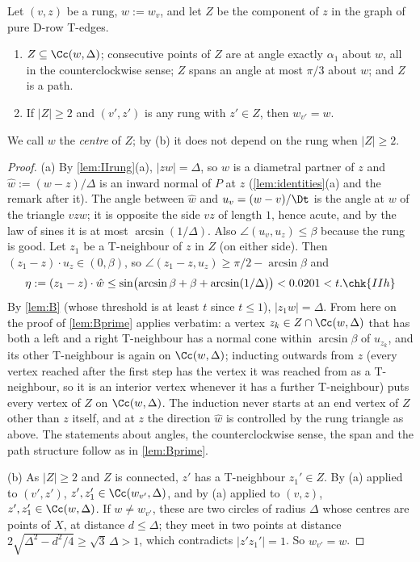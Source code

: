 \begin{lemma}\label{lem:IIZ}
Let $(v,z)$ be a rung, $w:=w_v$, and let $Z$ be the component of $z$ in the graph of pure D-row T-edges.
\begin{enumerate}[label=\textup{(\alph*)}]
\item $Z\subseteq\Cc(w,\Delta)$; consecutive points of $Z$ are at angle exactly $\alpha_1$ about $w$, all in the counterclockwise sense; $Z$ spans an angle at most $\pi/3$ about $w$; and $Z$ is a path.
\item If $|Z|\ge2$ and $(v',z')$ is any rung with $z'\in Z$, then $w_{v'}=w$.
\end{enumerate}
We call $w$ the \emph{centre} of $Z$; by \textup{(b)} it does not depend on the rung when $|Z|\ge2$.
\end{lemma}
\begin{proof}
(a) By \cref{lem:IIrung}(a), $|zw|=\Delta$, so $w$ is a diametral partner of $z$ and $\hat w:=(w-z)/\Delta$ is an inward normal of $P$ at $z$ (\cref{lem:identities}(a) and the remark after it). The angle between $\hat w$ and $u_v=(w-v)/\Dt$ is the angle at $w$ of the triangle $vzw$; it is opposite the side $vz$ of length $1$, hence acute, and by the law of sines it is at most $\arcsin(1/\Delta)$. Also $\angle(u_v,u_z)\le\beta$ because the rung is good. Let $z_1$ be a T-neighbour of $z$ in $Z$ (on either side). Then $(z_1-z)\cdot u_z\in(0,\beta)$, so $\angle(z_1-z,u_z)\ge\pi/2-\arcsin\beta$ and
\[
\eta:=(z_1-z)\cdot\hat w\le\sin\bigl(\arcsin\beta+\beta+\arcsin(1/\Delta)\bigr)<0.0201<t .\chk{IIh}
\]
By \cref{lem:B} (whose threshold is at least $t$ since $t\le1$), $|z_1w|=\Delta$. From here on the proof of \cref{lem:Bprime} applies verbatim: a vertex $z_k\in Z\cap\Cc(w,\Delta)$ that has both a left and a right T-neighbour has a normal cone within $\arcsin\beta$ of $u_{z_k}$, and its other T-neighbour is again on $\Cc(w,\Delta)$; inducting outwards from $z$ (every vertex reached after the first step has the vertex it was reached from as a T-neighbour, so it is an interior vertex whenever it has a further T-neighbour) puts every vertex of $Z$ on $\Cc(w,\Delta)$. The induction never starts at an end vertex of $Z$ other than $z$ itself, and at $z$ the direction $\hat w$ is controlled by the rung triangle as above. The statements about angles, the counterclockwise sense, the span and the path structure follow as in \cref{lem:Bprime}.

(b) As $|Z|\ge2$ and $Z$ is connected, $z'$ has a T-neighbour $z_1'\in Z$. By (a) applied to $(v',z')$, $z',z_1'\in\Cc(w_{v'},\Delta)$, and by (a) applied to $(v,z)$, $z',z_1'\in\Cc(w,\Delta)$. If $w\neq w_{v'}$, these are two circles of radius $\Delta$ whose centres are points of $X$, at distance $d\le\Delta$; they meet in two points at distance $2\sqrt{\Delta^2-d^2/4}\ge\sqrt3\,\Delta>1$, which contradicts $|z'z_1'|=1$. So $w_{v'}=w$.
\end{proof}

